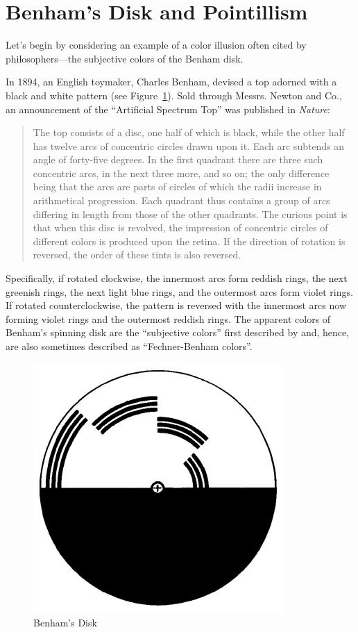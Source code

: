 \documentclass[12pt]{article}
\begin{document}

\section{Benham's Disk and Pointillism} %
\label{sec:benham_s_disk}

Let's begin by considering an example of a color illusion often cited by philosophers---the subjective colors of the Benham disk.

In 1894, an English toymaker, Charles Benham, devised a top adorned with a black and white pattern (see Figure~\ref{fig:benham}). Sold through Messrs. Newton and Co., an announcement of the ``Artificial Spectrum Top'' was published in \emph{Nature}:
	\begin{quote}
		The top consists of a disc, one half of which is black, while the other half has twelve arcs of concentric circles drawn upon it. Each arc subtends an angle of forty-five degrees. In the first quadrant there are three such concentric arcs, in the next three more, and so on; the only difference being that the arcs are parts of circles of which the radii increase in arithmetical progression. Each quadrant thus contains a group of arcs differing in length from those of the other quadrants. The curious point is that when this disc is revolved, the impression of concentric circles of different colors is produced upon the retina. If the direction of rotation is reversed, the order of these tints is also reversed. \citep{Benham:1894kx}
	\end{quote}
Specifically, if rotated clockwise, the innermost arcs form reddish rings, the next greenish rings, the next light blue rings, and the outermost arcs form violet rings. If rotated counterclockwise, the pattern is reversed with the innermost arcs now forming violet rings and the outermost reddish rings. The apparent colors of Benham's spinning disk are the ``subjective colors'' first described by \citep{Fechner:1838vn} and, hence, are also sometimes described as ``Fechner-Benham colors''. 

\begin{figure}[htbp]
	\centering
		\includegraphics[scale=.5]{graphics/benhams_disk.jpg}
	\caption{Benham's Disk}
	\label{fig:benham}
\end{figure}
\end{document}
